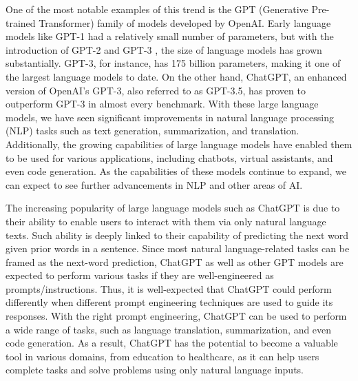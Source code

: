 \documentclass[sigconf,authordraft]{acmart}
\begin{document}

One of the most notable examples of this trend is the GPT (Generative Pre-trained Transformer) family of models developed by OpenAI. Early language models like GPT-1 \cite{GPT} had a relatively small number of parameters, but with the introduction of GPT-2 \cite{GPT-2} and GPT-3 \cite{GPT-3}, the size of language models has grown substantially. GPT-3, for instance, has 175 billion parameters, making it one of the largest language models to date. On the other hand, ChatGPT, an enhanced version of OpenAI's GPT-3, also referred to as GPT-3.5, has proven to outperform GPT-3 in almost every benchmark. With these large language models, we have seen significant improvements in natural language processing (NLP) tasks such as text generation, summarization, and translation. Additionally, the growing capabilities of large language models have enabled them to be used for various applications, including chatbots, virtual assistants, and even code generation. As the capabilities of these models continue to expand, we can expect to see further advancements in NLP and other areas of AI. 

The increasing popularity of large language models such as ChatGPT is due to their ability to enable users to  interact with them via only natural language texts. Such ability is deeply linked to their capability of predicting the next word given prior words in a sentence. Since most natural language-related tasks can be framed as the next-word prediction, ChatGPT as well as other GPT models are expected to perform various tasks if they are well-engineered as prompts/instructions. Thus, it is well-expected that ChatGPT could perform differently when different prompt engineering techniques are used to guide its responses. With the right prompt engineering, ChatGPT can be used to perform a wide range of tasks, such as language translation, summarization, and even code generation. As a result, ChatGPT has the potential to become a valuable tool in various domains, from education to healthcare, as it can help users complete tasks and solve problems using only natural language inputs.
\end{document}

